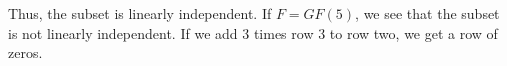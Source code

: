 \begin{ProbBox}
\begin{solution}
Thus, the subset is linearly independent. If $F=GF(5)$, we see that the subset is not linearly independent. If we add 3 times row 3 to row two, we get a row of zeros. 

\end{solution}
\end{ProbBox}
\probskip



